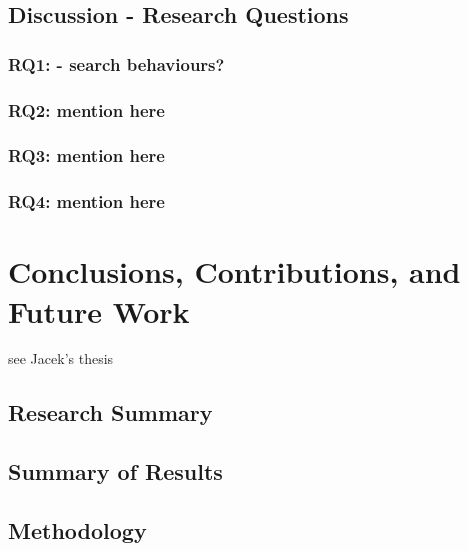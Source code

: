 \documentclass[letterpaper, nobind]{templates/ociamthesis}
\begin{document}
\hypertarget{discussion---research-questions}{%
\section{Discussion - Research Questions}\label{discussion---research-questions}}

\hypertarget{rq1---search-behaviours}{%
\subsection{RQ1: - search behaviours?}\label{rq1---search-behaviours}}

\hypertarget{rq2-mention-here}{%
\subsection{RQ2: mention here}\label{rq2-mention-here}}

\hypertarget{rq3-mention-here}{%
\subsection{RQ3: mention here}\label{rq3-mention-here}}

\hypertarget{rq4-mention-here}{%
\subsection{RQ4: mention here}\label{rq4-mention-here}}

\hypertarget{conclusions-contributions-and-future-work}{%
\chapter{Conclusions, Contributions, and Future Work}\label{conclusions-contributions-and-future-work}}

see Jacek's thesis

\hypertarget{research-summary}{%
\section{Research Summary}\label{research-summary}}

\hypertarget{summary-of-results}{%
\section{Summary of Results}\label{summary-of-results}}

\hypertarget{methodology}{%
\section{Methodology}\label{methodology}}
\end{document}
